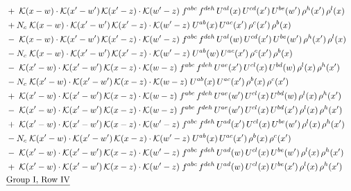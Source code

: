 \documentclass[9pt]{article}
\begin{document}
\begin{align}
&\quad +\;\mathcal{K}(x-w)\cdot\mathcal{K}(x'-w')\,\mathcal{K}(x'-z)\cdot\mathcal{K}(w'-z)\;f^{abc}\,f^{deh}\,U^{al}(x)\,U^{cd}(x')\,U^{be}(w')\,\rho^{h}(x')\,\rho^{l}(x)\notag\\
&\quad +N_c\;\mathcal{K}(x-w)\cdot\mathcal{K}(x'-w')\,\mathcal{K}(x'-z)\cdot\mathcal{K}(w'-z)\;U^{ab}(x)\,U^{ac}(x')\,\rho^{c}(x')\,\rho^{b}(x)\notag\\
&\quad -\;\mathcal{K}(x-w)\cdot\mathcal{K}(x'-w')\,\mathcal{K}(x'-z)\cdot\mathcal{K}(w'-z)\;f^{abc}\,f^{deh}\,U^{al}(w)\,U^{cd}(x')\,U^{be}(w')\,\rho^{h}(x')\,\rho^{l}(x)\notag\\
&\quad -N_c\;\mathcal{K}(x-w)\cdot\mathcal{K}(x'-w')\,\mathcal{K}(x'-z)\cdot\mathcal{K}(w'-z)\;U^{ab}(w)\,U^{ac}(x')\,\rho^{c}(x')\,\rho^{b}(x)\notag\\
&\quad -\;\mathcal{K}(x'-w)\cdot\mathcal{K}(x'-w')\,\mathcal{K}(x-z)\cdot\mathcal{K}(w-z)\;f^{abc}\,f^{deh}\,U^{ae}(x')\,U^{cl}(x)\,U^{bd}(w)\,\rho^{l}(x)\,\rho^{h}(x')\notag\\
&\quad -N_c\;\mathcal{K}(x'-w)\cdot\mathcal{K}(x'-w')\,\mathcal{K}(x-z)\cdot\mathcal{K}(w-z)\;U^{ab}(x)\,U^{ac}(x')\,\rho^{b}(x)\,\rho^{c}(x')\notag\\
&\quad +\;\mathcal{K}(x'-w)\cdot\mathcal{K}(x'-w')\,\mathcal{K}(x-z)\cdot\mathcal{K}(w-z)\;f^{abc}\,f^{deh}\,U^{ae}(w')\,U^{cl}(x)\,U^{bd}(w)\,\rho^{l}(x)\,\rho^{h}(x')\notag\\
&\quad -\;\mathcal{K}(x'-w)\cdot\mathcal{K}(x'-w')\,\mathcal{K}(x-z)\cdot\mathcal{K}(w-z)\;f^{abc}\,f^{deh}\,U^{ae}(w')\,U^{cl}(x)\,U^{bd}(x')\,\rho^{l}(x)\,\rho^{h}(x')\notag\\
&\quad +\;\mathcal{K}(x'-w)\cdot\mathcal{K}(x'-w')\,\mathcal{K}(x-z)\cdot\mathcal{K}(w'-z)\;f^{abc}\,f^{deh}\,U^{ad}(x')\,U^{cl}(x)\,U^{be}(w')\,\rho^{l}(x)\,\rho^{h}(x')\notag\\
&\quad -N_c\;\mathcal{K}(x'-w)\cdot\mathcal{K}(x'-w')\,\mathcal{K}(x-z)\cdot\mathcal{K}(w'-z)\;U^{ab}(x)\,U^{ac}(x')\,\rho^{b}(x)\,\rho^{c}(x')\notag\\
&\quad -\;\mathcal{K}(x'-w)\cdot\mathcal{K}(x'-w')\,\mathcal{K}(x-z)\cdot\mathcal{K}(w'-z)\;f^{abc}\,f^{deh}\,U^{ad}(w)\,U^{cl}(x)\,U^{be}(w')\,\rho^{l}(x)\,\rho^{h}(x')\notag\\
&\quad +\;\mathcal{K}(x'-w)\cdot\mathcal{K}(x'-w')\,\mathcal{K}(x-z)\cdot\mathcal{K}(w'-z)\;f^{abc}\,f^{deh}\,U^{ad}(w)\,U^{cl}(x)\,U^{be}(x')\,\rho^{l}(x)\,\rho^{h}(x')\notag\\
&\quad\underline{\text{Group I, Row IV}}\notag\\

\end{align}
\end{document}

